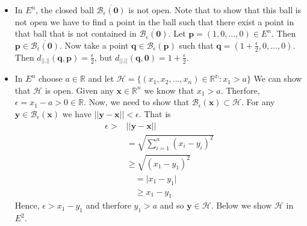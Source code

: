 \begin{itemize}
    \item
	In $E^n$, the closed ball $\overline{\mathcal{B}_{\epsilon}(\mathbf{0})}$ is not open.
	Note that to show that this ball is not open we have to find a point in the ball 
	such that there exist a point in that ball that is not contained in 
	$\overline{\mathcal{B}_{\epsilon}(\mathbf{0})}$.
	Let $\mathbf{p} = (1,0,\dots,0) \in E^n$. Then $\mathbf{p} \in 
	\overline{\mathcal{B}_{\epsilon}(\mathbf{0})}$. Now take a point $\mathbf{q} \in
	\mathcal{B}_{\epsilon}(\mathbf{p})$ such that $\mathbf{q} = (1+\frac{\epsilon}{2},0,\dots,0)$.
	Then $d_{\lvert\lvert . \rvert\rvert}(\mathbf{q},\mathbf{p}) = \frac{\epsilon}{2}$, but
	$d_{\lvert\lvert . \rvert\rvert}(\mathbf{q},\mathbf{0}) = 1 + \frac{\epsilon}{2}$.

    \item In $E^n$ choose $a \in \mathbb{R}$ and let $\mathcal{H} = \left.\lbrace 
	    (x_1, x_2, \dots, x_n) \in \mathbb{R^n} : x_1 > a \rbrace\right.$ 
	    We can show that $\mathcal{H}$ is open. Given any $\mathbf{x} \in \mathbb{R}^n$ we
	    know that $x_1 > a$. Therfore, $\epsilon = x_1 - a > 0 \in \mathbb{R}$. Now, we need
	   to show that $\mathcal{B}_{\epsilon}(\mathbf{x}) \subset \mathcal{H}$. For any 
	   $\mathbf{y} \in \mathcal{B}_{\epsilon}(\mathbf{x})$ we have $\lvert\lvert \mathbf{y} -
	   \mathbf{x} \rvert\rvert < \epsilon$. That is 
	   \begin{displaymath}
	       \begin{aligned}
		   \epsilon > & \lvert\lvert \mathbf{y} - \mathbf{x} \rvert\rvert \\
		    & = \sqrt{\sum_{i=1}^n(x_i-y_i)^2} \\
		    & \geq \sqrt{(x_1-y_1)^2} \\
		    &\quad = \lvert x_1 - y_1 \rvert \\
		    &\quad \geq x_1 - y_1
	       \end{aligned}
	   \end{displaymath}   
	   Hence, $ \epsilon > x_1 - y_1$ and therfore $y_1 > a$ and so $\mathbf{y} \in
	   \mathcal{H}$. Below we show $\mathcal{H}$ in $E^2$.

	   

\end{itemize}

